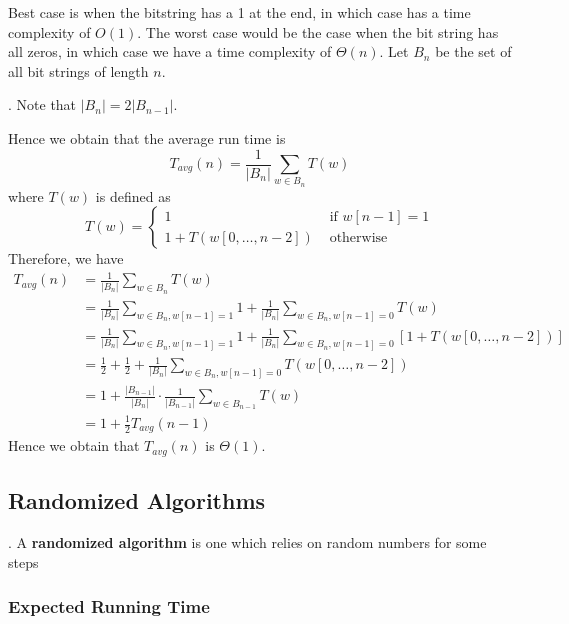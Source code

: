 \documentclass{article}
\begin{document}
\begin{solution}
    Best case is when the bitstring has a 1 at the end, in which case has a time complexity of $O(1)$. The worst case would be the case when the bit string has all zeros, in which case we have a time complexity of $\Theta(n)$. Let $B_n$ be the set of all bit strings of length $n$. 

    \begin{comm}[].
        Note that $|B_n| = 2 |B_{n-1}|$. 
    \end{comm}

    Hence we obtain that the average run time is 
    \[ T_{avg}(n) = \frac{1}{|B_n|} \sum_{w \in B_n} T(w) \]
    where $T(w)$ is defined as 
    \[ T(w) = \begin{cases}
        1 & \text{ if } w[n-1] = 1 \\ 
        1 + T(w[0, \ldots, n-2]) & \text{ otherwise}
    \end{cases} \]
    Therefore, we have 
    \begin{align*}
        T_{avg}(n) 
        & = \frac{1}{|B_n|} \sum_{w \in B_n} T(w) \\ 
        & = \frac{1}{|B_n|} \sum_{w \in B_n, w[n-1]=1} 1 + \frac{1}{|B_n|} \sum_{w \in B_n, w[n-1]=0} T(w) \\ 
        & = \frac{1}{|B_n|} \sum_{w \in B_n, w[n-1]=1} 1 + \frac{1}{|B_n|} \sum_{w \in B_n, w[n-1]=0} \left[ 1 +  T(w[0, \ldots, n-2]) \right] \\ 
        & = \frac{1}{2} + \frac{1}{2} + \frac{1}{|B_n|} \sum_{w \in B_n, w[n-1]=0} T(w[0, \ldots, n-2]) \\ 
        & = 1 + \frac{|B_{n-1}|}{|B_n|} \cdot \frac{1}{|B_{n-1}|} \sum_{w \in B_{n-1}} T(w) \\ 
        & = 1 + \frac{1}{2} T_{avg}(n-1)
    \end{align*}
    Hence we obtain that $T_{avg}(n)$ is $\Theta(1)$. 
\end{solution}

\subsection{Randomized Algorithms}

\begin{deff}.
    A \textbf{randomized algorithm} is one which relies on random numbers for some steps
\end{deff}

\subsubsection{Expected Running Time} 
\end{document}
